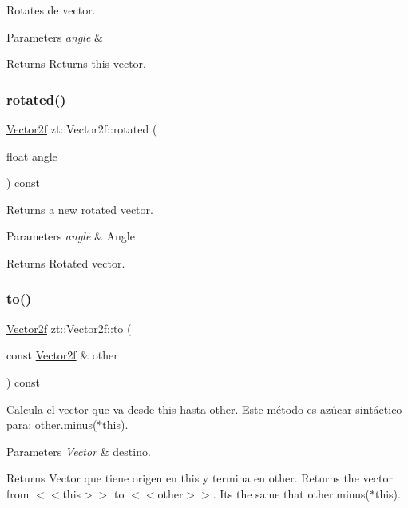 Rotates de vector. 


\begin{DoxyParams}{Parameters}
{\em angle} & \\
\hline
\end{DoxyParams}
\begin{DoxyReturn}{Returns}
Returns this vector. 
\end{DoxyReturn}
\mbox{\label{classzt_1_1_vector2f_a1b301634478a665f0e0e7cacdc568cac}} 
\subsubsection{\texorpdfstring{rotated()}{rotated()}}
{\footnotesize\ttfamily \hyperlink{classzt_1_1_vector2f}{Vector2f} zt\+::\+Vector2f\+::rotated (\begin{DoxyParamCaption}\item[{float}]{angle }\end{DoxyParamCaption}) const}



Returns a new rotated vector. 


\begin{DoxyParams}{Parameters}
{\em angle} & Angle \\
\hline
\end{DoxyParams}
\begin{DoxyReturn}{Returns}
Rotated vector. 
\end{DoxyReturn}
\mbox{\label{classzt_1_1_vector2f_a2aa1ef32f78d6399891f6318e9a0cd3c}} 
\subsubsection{\texorpdfstring{to()}{to()}}
{\footnotesize\ttfamily \hyperlink{classzt_1_1_vector2f}{Vector2f} zt\+::\+Vector2f\+::to (\begin{DoxyParamCaption}\item[{const \hyperlink{classzt_1_1_vector2f}{Vector2f} \&}]{other }\end{DoxyParamCaption}) const}

Calcula el vector que va desde this hasta other. Este método es azúcar sintáctico para\+: other.\+minus($\ast$this). 
\begin{DoxyParams}{Parameters}
{\em Vector} & destino. \\
\hline
\end{DoxyParams}
\begin{DoxyReturn}{Returns}
Vector que tiene origen en this y termina en other. Returns the vector from $<$$<$this$>$$>$ to $<$$<$other$>$$>$. Its the same that other.\+minus($\ast$this). 
\end{DoxyReturn}

